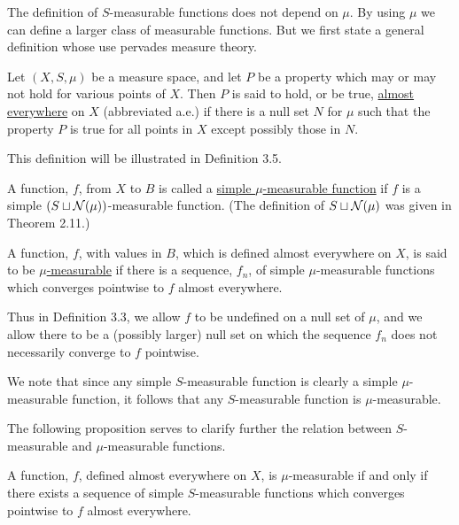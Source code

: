 The definition of $S$-measurable functions does not depend on $\mu$. By using $\mu$ we can define a larger class of measurable functions. But we first state a general definition whose use pervades measure theory.

\begin{definition}
Let $(X,S,\mu)$ be a measure space, and let $P$ be a property which may or may not hold for various points of $X$. Then $P$ is said to hold, or be true, \underline{almost everywhere} on $X$ (abbreviated a.e.) if there is a null set $N$ for $\mu$ such that the property $P$ is true for all points in $X$ except possibly those in $N$.
\end{definition}

This definition will be illustrated in Definition 3.5.

\begin{definition}
A function, $f$, from $X$ to $B$ is called a \underline{simple $\mu$-measurable function} if $f$ is a simple $(S\sqcup{\cal N}(\mu))$-measurable function. (The definition of $S\sqcup{\cal N}(\mu)$ was given in Theorem 2.11.)
\end{definition}

\begin{definition}
A function, $f$, with values in $B$, which is defined almost everywhere on $X$, is said to be \underline{$\mu$-measurable} if there is a sequence, $f_n$, of simple $\mu$-measurable functions which converges pointwise to $f$ almost everywhere.
\end{definition}

Thus in Definition 3.3, we allow $f$ to be undefined on a null set of $\mu$, and we allow there to be a (possibly larger) null set on which the sequence $f_n$ does not necessarily converge to $f$ pointwise.

We note that since any simple $S$-measurable function is clearly a simple $\mu$-measurable function, it follows that any $S$-measurable function is $\mu$-measurable.

The following proposition serves to clarify further the relation between $S$-measurable and $\mu$-measurable functions.

\begin{proposition}
A function, $f$, defined almost everywhere on $X$, is $\mu$-measurable if and only if there exists a sequence of simple $S$-measurable functions which converges pointwise to $f$ almost everywhere.
\end{proposition}

